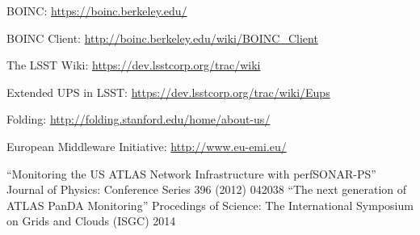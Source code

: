 \begin{thebibliography}{99}
 BOINC: \url{https://boinc.berkeley.edu/}

 BOINC Client: \url{http://boinc.berkeley.edu/wiki/BOINC_Client}

 The LSST Wiki: \url{https://dev.lsstcorp.org/trac/wiki}

 Extended UPS in LSST: \url{https://dev.lsstcorp.org/trac/wiki/Eups}

 Folding: \url{http://folding.stanford.edu/home/about-us/}

 European Middleware Initiative: \url{http://www.eu-emi.eu/}

 ``Monitoring the US ATLAS Network Infrastructure with perfSONAR-PS'' Journal of Physics: Conference Series 396 (2012) 042038
 ``The next generation of ATLAS PanDA Monitoring'' Procedings of Science: The International Symposium on Grids and Clouds (ISGC) 2014
\end{thebibliography}
